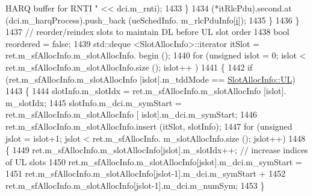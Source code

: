 \begin{DoxyCode}
{       HARQ buffer for RNTI "} << dci.m\_rnti);
1433                                         \}
1434                                         (*itRlcPdu).second.at (dci.m\_harqProcess).push\_back (ueSchedInfo.
      m\_rlcPduInfo[\hyperlink{bernuolliDistribution_8m_a6f6ccfcf58b31cb6412107d9d5281426}{i}]);
1435                                 \}
1436                         \}
1437                         \textcolor{comment}{// reorder/reindex slots to maintain DL before UL slot order}
1438                         \textcolor{keywordtype}{bool} reordered = \textcolor{keyword}{false};
1439                         std::deque <SlotAllocInfo>::iterator itSlot = ret.m\_sfAllocInfo.m\_slotAllocInfo.
      begin ();
1440                         \textcolor{keywordflow}{for} (\textcolor{keywordtype}{unsigned} islot = 0; islot < ret.m\_sfAllocInfo.m\_slotAllocInfo.size (); islot++
      )
1441                         \{
1442                                 \textcolor{keywordflow}{if} (ret.m\_sfAllocInfo.m\_slotAllocInfo [islot].m\_tddMode == 
      \hyperlink{structns3_1_1SlotAllocInfo_a6cad60db1d39034f1851e2cea625fe5da916b5be54594ead6ed677c570311cad2}{SlotAllocInfo::UL})
1443                                 \{
1444                                         slotInfo.m\_slotIdx = ret.m\_sfAllocInfo.m\_slotAllocInfo [islot].
      m\_slotIdx;
1445                                         slotInfo.m\_dci.m\_symStart = ret.m\_sfAllocInfo.m\_slotAllocInfo [
      islot].m\_dci.m\_symStart;
1446                                         ret.m\_sfAllocInfo.m\_slotAllocInfo.insert (itSlot, slotInfo);
1447                                         \textcolor{keywordflow}{for} (\textcolor{keywordtype}{unsigned} jslot = islot+1; jslot < ret.m\_sfAllocInfo.
      m\_slotAllocInfo.size (); jslot++)
1448                                         \{
1449                                                 ret.m\_sfAllocInfo.m\_slotAllocInfo[jslot].m\_slotIdx++;   \textcolor{comment}{//
       increase indices of UL slots}
1450                                                 ret.m\_sfAllocInfo.m\_slotAllocInfo[jslot].m\_dci.m\_symStart =
1451                                                                                                                                         
      ret.m\_sfAllocInfo.m\_slotAllocInfo[jslot-1].m\_dci.m\_symStart +
1452                                                                                                                                         
      ret.m\_sfAllocInfo.m\_slotAllocInfo[jslot-1].m\_dci.m\_numSym;
1453                                         \}

\end{DoxyCode}

